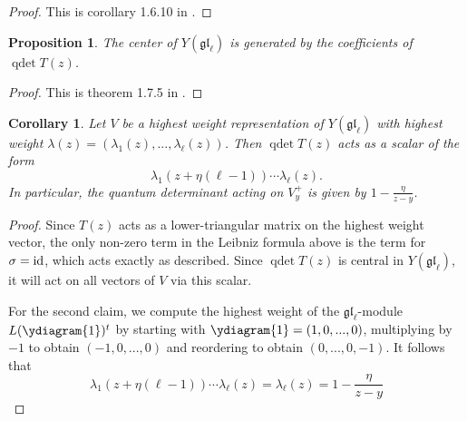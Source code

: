 \documentclass[11pt]{report}
\newtheorem{prop}[theorem]{Proposition}
\newtheorem{corollary}[theorem]{Corollary}
\theoremstyle{definition}
\theoremstyle{remark}
\theoremstyle{remark}
\newcommand{\id}{\textnormal{id}}
\begin{document}
\begin{proof}
This is corollary 1.6.10 in \cite{book:molev}.
\end{proof}

\begin{prop}
The center of $Y(\mathfrak{gl}_\ell)$ is generated by the coefficients of $\operatorname{qdet} T(z)$.
\end{prop}

\begin{proof}
This is theorem 1.7.5 in \cite{book:molev}.
\end{proof}

\begin{corollary}\label{corollary:quantumDetWeights}
Let $V$ be a highest weight representation of $Y(\mathfrak{gl}_\ell)$ with highest weight $\lambda(z) = (\lambda_1(z),...,\lambda_\ell(z))$. Then $\operatorname{qdet} T(z)$ acts as a scalar of the form
\begin{equation*}
\lambda_1(z+\eta(\ell-1)) \cdots \lambda_\ell(z).
\end{equation*}
In particular, the quantum determinant acting on $V_y^+$ is given by $1 - \frac{\eta}{z-y}$.
\end{corollary}

\begin{proof}
Since $T(z)$ acts as a lower-triangular matrix on the highest weight vector, the only non-zero term in the Leibniz formula above is the term for $\sigma = \id$, which acts exactly as described. Since $\operatorname{qdet} T(z)$ is central in $Y(\mathfrak{gl}_\ell)$, it will act on all vectors of $V$ via this scalar.

For the second claim, we compute the highest weight of the $\mathfrak{gl}_\ell$-module $L(\ydiagram{1})^t$ by starting with $\ydiagram{1} = (1,0,...,0)$, multiplying by $-1$ to obtain $(-1,0,...,0)$ and reordering to obtain $(0,...,0,-1)$. It follows that
\begin{equation*}
\lambda_1(z+\eta(\ell-1)) \cdots \lambda_\ell(z) = \lambda_\ell(z) = 1 - \frac{\eta}{z-y}
\end{equation*}
\end{proof}
\end{document}
